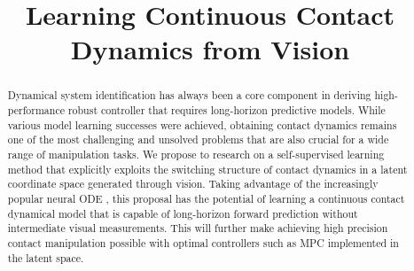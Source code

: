 \documentclass[conference]{IEEEtran}
\begin{document}
\title{Learning Continuous Contact Dynamics from Vision}


\author{
}

\maketitle

\begin{abstract}
  Dynamical system identification has always been a core component in deriving
  high-performance robust controller that requires long-horizon predictive models.
  While various model learning successes were achieved,
  obtaining contact dynamics remains one of the most challenging and unsolved
  problems that are also crucial for a wide range of manipulation tasks. We
  propose to research on a self-supervised learning method that explicitly
  exploits the switching structure of contact dynamics in a latent coordinate
  space generated through vision. Taking advantage of the increasingly popular
  neural ODE \cite{neural_ode}, this proposal has the potential of learning a
  continuous contact dynamical model that is capable of long-horizon forward prediction without
  intermediate visual measurements. This will further make achieving high precision
  contact manipulation possible with optimal controllers such as MPC
  implemented in the latent space.
\end{abstract}

\IEEEpeerreviewmaketitle
\end{document}
